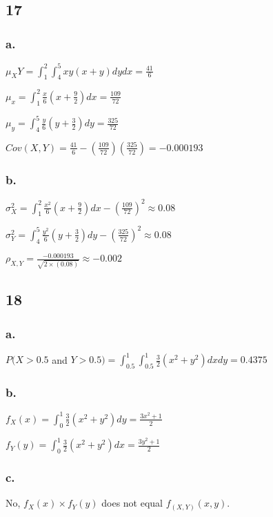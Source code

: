 \documentclass[11pt]{article}
\begin{document}
\subsection{17}
\subsubsection{a.}
$\mu_XY = \int_{1}^{2}\int_{4}^{5}xy(x+y)dydx = \frac{41}{6}$

$\mu_x = \int_{1}^{2}\frac{x}{6}\left( x + \frac{9}{2} \right) dx =
\frac{109}{72}$

$\mu_y = \int_{4}^{5}\frac{y}{6}\left( y+\frac{3}{2} \right)dy =
\frac{325}{72}$

$Cov(X,Y) = \frac{41}{6} - \left( \frac{109}{72} \right)\left(\frac{325}{72}
\right) = -0.000193$

\subsubsection{b.}
$\sigma_X^2 = \int_{1}^{2}\frac{x^2}{6}\left( x+\frac{9}{2} \right) dx - \left(
\frac{109}{72}\right)^2 \approx 0.08$

$\sigma_Y^2 = \int_{4}^{5}\frac{y^2}{6} \left( y+\frac{3}{2} \right) dy - \left(
\frac{325}{72} \right)^2 \approx 0.08$

$\rho_{X,Y} = \frac{-0.000193}{\sqrt{2\times (0.08)}} \approx -0.002$


\subsection{18}
\subsubsection{a.}
$P(X>0.5$ and $Y>0.5) = \int_{0.5}^{1}\int_{0.5}^{1}\frac{3}{2}\left( x^2+y^2
\right) dx dy = 0.4375 $
\subsubsection{b.}
$f_X(x) = \int_{0}^{1} \frac{3}{2} \left( x^2 + y^2 \right) dy = 
\frac{3x^2+1}{2}$

$f_Y(y) = \int_{0}^{1} \frac{3}{2} \left( x^2 + y^2 \right) dx = 
\frac{3y^2+1}{2}$
\subsubsection{c.}
No, $f_X(x) \times f_Y(y)$ does not equal $f_(X,Y)(x,y)$. 
\end{document}
